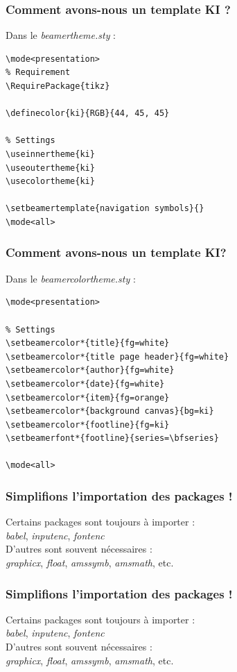 \documentclass[handout]{beamer}
\begin{document}
\begin{frame}[fragile=singleslide]
\frametitle{Comment avons-nous un template KI ?}
Dans le \textit{beamertheme.sty} :
\begin{verbatim}
\mode<presentation>
% Requirement
\RequirePackage{tikz}

\definecolor{ki}{RGB}{44, 45, 45}

% Settings
\useinnertheme{ki}
\useoutertheme{ki}
\usecolortheme{ki}

\setbeamertemplate{navigation symbols}{}
\mode<all>
\end{verbatim}
\end{frame}

\begin{frame}[fragile=singleslide]
\frametitle{Comment avons-nous un template KI?}
Dans le \textit{beamercolortheme.sty} :
\begin{verbatim}
\mode<presentation>

% Settings
\setbeamercolor*{title}{fg=white}
\setbeamercolor*{title page header}{fg=white}
\setbeamercolor*{author}{fg=white}
\setbeamercolor*{date}{fg=white}
\setbeamercolor*{item}{fg=orange}
\setbeamercolor*{background canvas}{bg=ki}
\setbeamercolor*{footline}{fg=ki}
\setbeamerfont*{footline}{series=\bfseries}

\mode<all>
\end{verbatim}
\end{frame}

\begin{frame}
\frametitle{Simplifions l'importation des packages !}
Certains packages sont toujours à importer : \\ \textit{babel}, \textit{inputenc}, \textit{fontenc}\\
D'autres sont souvent nécessaires : \\
\textit{graphicx}, \textit{float}, \textit{amssymb}, \textit{amsmath}, etc.
\end{frame}

\begin{frame}
\frametitle{Simplifions l'importation des packages !}
Certains packages sont toujours à importer : \\ \textit{babel}, \textit{inputenc}, \textit{fontenc}\\
D'autres sont souvent nécessaires : \\
\textit{graphicx}, \textit{float}, \textit{amssymb}, \textit{amsmath}, etc.\\

\hspace{5em}
\end{frame}
\end{document}
